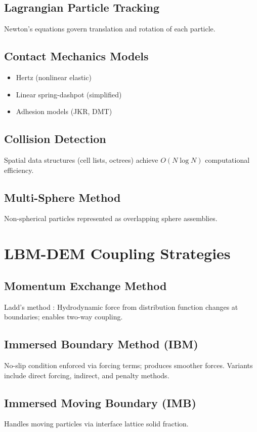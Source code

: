 \subsection{Lagrangian Particle Tracking}
Newton's equations govern translation and rotation of each particle.

\subsection{Contact Mechanics Models}
\begin{itemize}
    \item Hertz (nonlinear elastic)
    \item Linear spring-dashpot (simplified)
    \item Adhesion models (JKR, DMT)
\end{itemize}

\subsection{Collision Detection}
Spatial data structures (cell lists, octrees) achieve $O(N \log N)$ computational efficiency.

\subsection{Multi-Sphere Method}
Non-spherical particles represented as overlapping sphere assemblies.

\section{LBM-DEM Coupling Strategies}

\subsection{Momentum Exchange Method}
Ladd's method \cite{ladd1994}: Hydrodynamic force from distribution function changes at boundaries; enables two-way coupling.

\subsection{Immersed Boundary Method (IBM)}
No-slip condition enforced via forcing terms; produces smoother forces. Variants include direct forcing, indirect, and penalty methods.

\subsection{Immersed Moving Boundary (IMB)}
Handles moving particles via interface lattice solid fraction.

